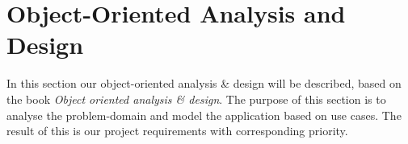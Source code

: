 \section{Object-Oriented Analysis and Design}

In this section our object-oriented analysis \& design will be described, based on the book \textit{Object oriented analysis \& design}\cite{OOAD}. The purpose of this section is to analyse the problem-domain and model the application based on use cases. The result of this is our project requirements with corresponding priority.